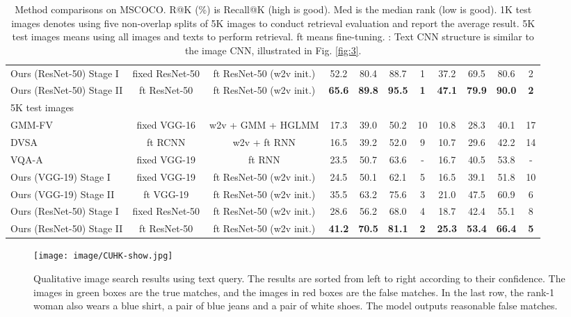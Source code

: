 \documentclass[10pt,final,journal]{IEEEtran}
\begin{document}
\begin{table*}
\begin{center}
\begin{tabular}{l|c|c|cccc|cccc}
Ours (ResNet-50) Stage I &fixed ResNet-50 & ft ResNet-50 (w2v init.)& 52.2 & 80.4 & 88.7 & 1 & 37.2 & 69.5 & 80.6 & 2 \\
Ours (ResNet-50) Stage II & ft ResNet-50 & ft ResNet-50 (w2v init.)& \textbf{65.6} & \textbf{89.8} & \textbf{95.5} & \textbf{1} & \textbf{47.1} & \textbf{79.9} & \textbf{90.0} &  \textbf{2}  \\
\shline
5K test images\\
\shline
GMM-FV \cite{klein2015associating} & fixed VGG-16 & w2v + GMM + HGLMM  & 17.3 & 39.0 & 50.2 & 10 & 10.8 & 28.3 & 40.1 & 17\\
DVSA \cite{karpathy2015deep} & ft RCNN & w2v + ft RNN & 16.5 & 39.2 & 52.0 & 9 & 10.7 & 29.6 & 42.2 & 14 \\
VQA-A \cite{lin2016leveraging} & fixed VGG-19 & ft RNN  & 23.5 & 50.7 & 63.6 & - & 16.7 & 40.5 & 53.8 & - \\
\hline
Ours (VGG-19) Stage I  & fixed VGG-19 & ft ResNet-50 (w2v init.)& 24.5 & 50.1 & 62.1 & 5 & 16.5 & 39.1 & 51.8 & 10 \\
Ours (VGG-19) Stage II  & ft VGG-19 & ft ResNet-50 (w2v init.)& 35.5 & 63.2 & 75.6 & 3 & 21.0 & 47.5 & 60.9 & 6 \\
Ours (ResNet-50) Stage I  & fixed ResNet-50 & ft ResNet-50 (w2v init.)& 28.6 & 56.2 & 68.0 & 4 & 18.7 & 42.4 & 55.1 & 8 \\
Ours (ResNet-50) Stage II  & ft ResNet-50 & ft ResNet-50 (w2v init.) & \textbf{41.2} & \textbf{70.5} & \textbf{81.1} & \textbf{2} & \textbf{25.3} & \textbf{53.4} & \textbf{66.4} & \textbf{5} \\
\hline
\end{tabular}
\end{center}
\vspace{-.05in}
\caption{Method comparisons on MSCOCO. R@K (\%) is Recall@K (high is good). Med  is the median rank (low is good). 1K test images denotes using five non-overlap splits of 5K images to conduct retrieval evaluation and report the average result. 5K test images means using all images and texts to perform retrieval. ft means fine-tuning. : Text CNN structure is similar to the image CNN, illustrated in Fig. \ref{fig:3}.}
\vspace{-.1in}
\label{table:MSCOCO}
\end{table*}

\begin{figure}[t]
\begin{center}
\texttt{[image: image/CUHK-show.jpg]}
\end{center}
   \caption{Qualitative image search results using text query. The results are sorted from left to right according to their confidence. The images in green boxes are the true matches, and the images in red boxes are the false matches. In the last row, the rank-1 woman also wears a blue shirt, a pair of blue jeans and a pair of white shoes. The model outputs reasonable false matches. }
\label{fig:CUHK}
\end{figure}
\end{document}
